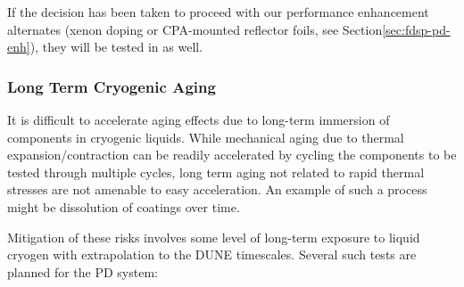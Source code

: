 If the decision has been taken to proceed with our performance enhancement alternates (xenon doping or CPA-mounted reflector foils, see Section\ref{sec:fdsp-pd-enh}), they will be tested in  as well.

\subsubsection{Long Term Cryogenic Aging}
\label{sec:valid-longtermaging}


It is difficult to accelerate aging effects due to long-term immersion of components in cryogenic liquids.  While mechanical aging due to thermal expansion/contraction can be readily accelerated by cycling the components to be tested through multiple cycles, long term aging not related to rapid thermal stresses are not amenable to easy acceleration.  An example of such a process might be dissolution of  coatings over time.

Mitigation of these risks involves some level of long-term exposure to liquid cryogen with extrapolation to the DUNE timescales.  Several such tests are planned for the PD system:

